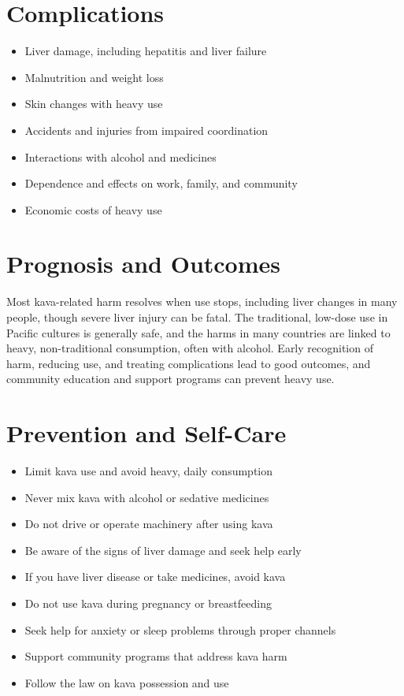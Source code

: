 \section*{Complications}
\begin{itemize}
    \item Liver damage, including hepatitis and liver failure
    \item Malnutrition and weight loss
    \item Skin changes with heavy use
    \item Accidents and injuries from impaired coordination
    \item Interactions with alcohol and medicines
    \item Dependence and effects on work, family, and community
    \item Economic costs of heavy use
\end{itemize}

\section*{Prognosis and Outcomes}
Most kava-related harm resolves when use stops, including liver changes in many people, though severe liver injury can be fatal. The traditional, low-dose use in Pacific cultures is generally safe, and the harms in many countries are linked to heavy, non-traditional consumption, often with alcohol. Early recognition of harm, reducing use, and treating complications lead to good outcomes, and community education and support programs can prevent heavy use.

\section*{Prevention and Self-Care}
\begin{itemize}
    \item Limit kava use and avoid heavy, daily consumption
    \item Never mix kava with alcohol or sedative medicines
    \item Do not drive or operate machinery after using kava
    \item Be aware of the signs of liver damage and seek help early
    \item If you have liver disease or take medicines, avoid kava
    \item Do not use kava during pregnancy or breastfeeding
    \item Seek help for anxiety or sleep problems through proper channels
    \item Support community programs that address kava harm
    \item Follow the law on kava possession and use
\end{itemize}

